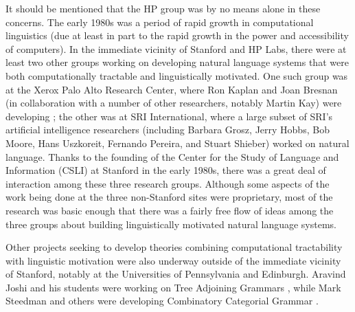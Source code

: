 \documentclass[output=paper]{langsci/langscibook}
\begin{document}
It should be mentioned that the HP group was by no means alone in these concerns.  The early 1980s was a period of rapid growth in computational linguistics (due at least in part to the rapid growth in the power and accessibility of computers).  In the immediate vicinity of Stanford and HP Labs, there were at least two other groups working on developing natural language systems that were both computationally tractable and linguistically motivated.  One such group was at the Xerox Palo Alto Research Center, where Ron Kaplan and Joan Bresnan (in collaboration with a number of other researchers, notably Martin Kay) were developing ; the other was at SRI International, where a large subset of SRI's artificial intelligence researchers  (including Barbara Grosz, Jerry Hobbs, Bob Moore, Hans Uszkoreit, Fernando Pereira, and Stuart Shieber) worked on natural language.  Thanks to the founding of the Center for the Study of Language and Information (CSLI) at Stanford in the early 1980s, there was a great deal of interaction among these three research groups.  Although some aspects of the work being done at the three non-Stanford sites were proprietary, most of the research was basic enough that there was a fairly free flow of ideas among the three groups about building linguistically motivated natural language systems.

Other projects seeking to develop theories combining computational tractability with linguistic motivation were also underway outside of the immediate vicinity of Stanford, notably at the Universities of Pennsylvania and Edinburgh.  Aravind Joshi and his students were working on Tree Adjoining Grammars \citep{JLT75a-u,Joshi87a-u}, while Mark Steedman and others were developing Combinatory Categorial Grammar \citep{Steedman87a-u,Steedman90a-u}.
\end{document}
